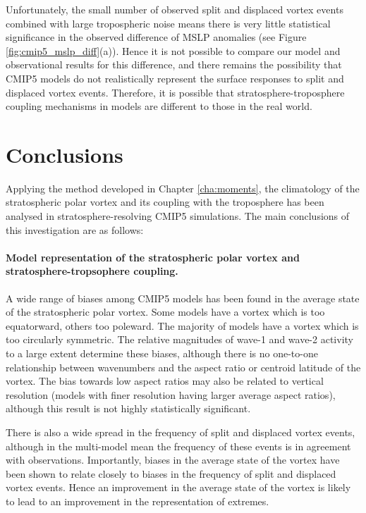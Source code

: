 Unfortunately, the small number of observed split and displaced vortex events
combined with large tropospheric noise means there is very little statistical
significance in the observed difference of MSLP anomalies (see Figure
\ref{fig:cmip5_mslp_diff}(a)). Hence it is not possible to compare our model and
observational results for this difference, and there remains the
possibility that CMIP5 models do not realistically represent the surface
responses to split and displaced vortex events. Therefore, it is possible that
stratosphere-troposphere coupling mechanisms in models are different to those in
the real world. 

\section{Conclusions}

Applying the method developed in Chapter \ref{cha:moments}, the climatology of
the stratospheric polar vortex and its coupling with the troposphere has been
analysed in stratosphere-resolving CMIP5 simulations. The main conclusions of
this investigation are as follows:


\paragraph{Model representation of the stratospheric polar vortex and
  stratosphere-tropsophere coupling.} A wide range of biases among CMIP5 models
has been found in the average state of the stratospheric polar vortex. Some
models have a vortex which is too equatorward, others too poleward. The majority
of models have a vortex which is too circularly symmetric. The relative
magnitudes of wave-1 and wave-2 activity to a large extent determine these
biases, although there is no one-to-one relationship between wavenumbers and the
aspect ratio or centroid latitude of the vortex. The bias towards low aspect
ratios may also be related to vertical resolution (models with finer resolution
having larger average aspect ratios), although this result is not highly
statistically significant.

There is also a wide spread in the frequency of split and displaced vortex
events, although in the multi-model mean the frequency of these events is in
agreement with observations. Importantly, biases in the average state of the
vortex have been shown to relate closely to biases in the frequency of split and
displaced vortex events. Hence an improvement in the average state of the vortex
is likely to lead to an improvement in the representation of extremes.

